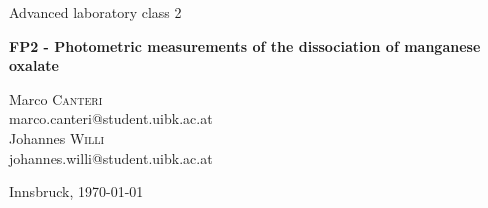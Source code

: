 \documentclass[a4paper,10pt]{article}
\begin{document}
\begin{titlepage}
 \begin{center}
	\Large{Advanced laboratory class 2}
	\end{center}
	\begin{center}
	 \LARGE{\textbf{FP2 - Photometric measurements of the dissociation of manganese oxalate}}
	\end{center}
	
	\begin{center}
	
	\large Marco \textsc{Canteri} \\
	marco.canteri@student.uibk.ac.at\\
	\large Johannes \textsc{Willi} \\
	johannes.willi@student.uibk.ac.at
	\end{center}
	
	\begin{center}
	\vspace{1cm}
	Innsbruck, \today
	\vspace{2cm}
	\end{center}
	

\end{titlepage}
\end{document}
